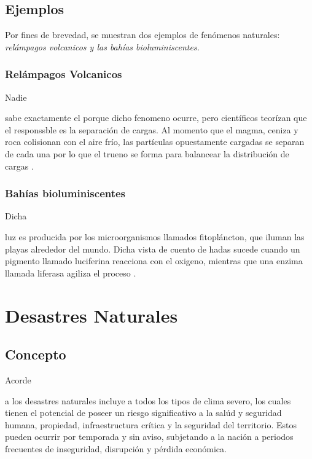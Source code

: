 \documentclass[stu, 12pt, letterpaper, donotrepeattitle, floatsintext, natbib]{apa7}
\begin{document}
\subsection{Ejemplos}
\begin{justifying}
    Por fines de brevedad, se muestran dos ejemplos de fenómenos naturales: \emph{relámpagos volcanicos y las bahías bioluminiscentes.}\par     
\end{justifying}
\vspace{\baselineskip}
\subsubsection{Relámpagos Volcanicos}
Nadie \begin{justifying}
    sabe exactamente el porque dicho fenomeno ocurre, pero científicos teorízan que el responssble es la separación de cargas.
    Al momento que el magma, ceniza y roca colisionan con el aire frío, las partículas opuestamente cargadas se separan de cada una por lo que
    el trueno se forma para balancear la distribución de cargas \citep{unknown-author-2018}. %
\end{justifying}
\vspace{\baselineskip}
\subsubsection{Bahías bioluminiscentes}
Dicha \begin{justifying}
    luz es producida por los microorganismos llamados fitopláncton, que iluman las playas alrededor del mundo. Dicha vista de cuento de hadas
    sucede cuando un pigmento llamado luciferina reacciona con el oxigeno, mientras que una enzima llamada liferasa agiliza el proceso \citep{unknown-author-2018}.\par %
\end{justifying}
\vspace{\baselineskip}
\section{Desastres Naturales}
\subsection{Concepto}
Acorde \begin{justifying}
    a \cite{unknown-author-2021} %
    los desastres naturales incluye a todos los tipos de clima severo, los cuales tienen el potencial de poseer un riesgo
    significativo a la salúd y seguridad humana, propiedad, infraestructura crítica y la seguridad del territorio. Estos pueden
    ocurrir por temporada y sin aviso, subjetando a la nación a periodos frecuentes de inseguridad, disrupción y pérdida económica.\par
\end{justifying}
\vspace{\baselineskip}
\end{document}
